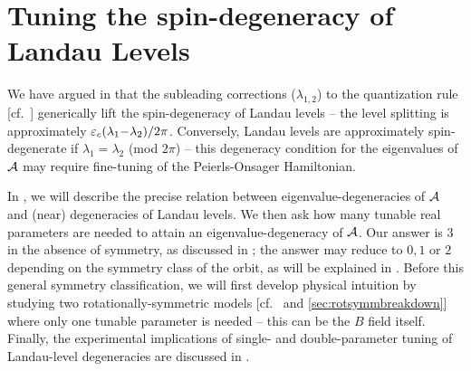 \documentclass[aps, prb, showpacs, twocolumn, notitlepage, superscriptaddress]{revtex4-1}
\begin{document}






\section{Tuning the spin-degeneracy of Landau Levels}\label{sec:llquasideg}

We have argued in  that the subleading corrections ($\lambda_{1,2}$) to the quantization rule [cf.\ ] generically lift the spin-degeneracy of Landau levels -- the level splitting is approximately $\varepsilon_c(\lambda_1{-}\lambda_2)/2\pi$. Conversely, Landau levels are approximately spin-degenerate if $\lambda_1{=}\lambda_2$ (mod $2\pi$) -- this degeneracy condition for the eigenvalues of ${\cal A}$ may require fine-tuning of the Peierls-Onsager Hamiltonian.  

In , we will describe the precise relation between eigenvalue-degeneracies of  ${\cal A}$ and (near) degeneracies of Landau levels. We then ask how many tunable real parameters are needed to attain an eigenvalue-degeneracy of ${\cal A}$. Our answer is  $3$ in the absence of symmetry, as discussed in ; the answer may reduce to $0,1$ or $2$ depending on the symmetry class of the orbit, as will be explained in . Before this general symmetry classification,  we will first develop physical intuition by studying two rotationally-symmetric models [cf.\  and \ref{sec:rotsymmbreakdown}] where only one tunable parameter is needed -- this can be the $B$ field itself. Finally, the experimental implications of single- and double-parameter tuning of Landau-level degeneracies are discussed in .
\end{document}
